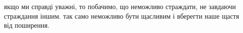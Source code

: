 якщо ми справді уважні, то побачимо, що неможливо страждати, не завдаючи страждання іншим. так само неможливо бути щасливим і вберегти наше щастя від поширення.

